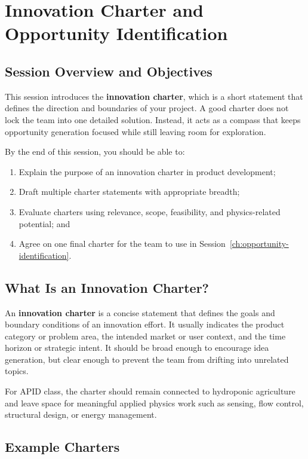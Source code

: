 \chapter{Innovation Charter and Opportunity Identification}
\label{sec:innovation-charter}

\section{Session Overview and Objectives}

This session introduces the \textbf{innovation charter}, which is a short statement that defines the direction and boundaries of your project. A good charter does not lock the team into one detailed solution. Instead, it acts as a compass that keeps opportunity generation focused while still leaving room for exploration.

By the end of this session, you should be able to:
\begin{enumerate}
    \item Explain the purpose of an innovation charter in product development;
    \item Draft multiple charter statements with appropriate breadth;
    \item Evaluate charters using relevance, scope, feasibility, and physics-related potential; and
    \item Agree on one final charter for the team to use in Session~\ref{ch:opportunity-identification}.
\end{enumerate}

\section{What Is an Innovation Charter?}

An \textbf{innovation charter} is a concise statement that defines the goals and boundary conditions of an innovation effort. It usually indicates the product category or problem area, the intended market or user context, and the time horizon or strategic intent. It should be broad enough to encourage idea generation, but clear enough to prevent the team from drifting into unrelated topics.

For APID class, the charter should remain connected to hydroponic agriculture and leave space for meaningful applied physics work such as sensing, flow control, structural design, or energy management.

\section{Example Charters}


